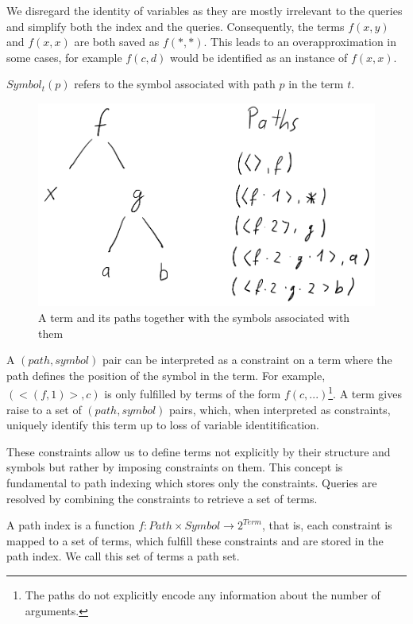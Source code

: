 We disregard the identity of variables as they are mostly irrelevant to the queries and simplify both the index and the queries. Consequently, the terms $f(x,y)$ and $f(x,x)$ are both saved as $f(*,*)$. This leads to an overapproximation in some cases, for example $f(c,d)$ would be identified as an instance of $f(x,x)$.

\begin{defn}
  $Symbol_{t}(p)$ refers to the symbol associated with path $p$ in the term $t$.
\end{defn}

\begin{figure}[h]
\centering
\includegraphics[scale=0.25]{figures/term_path.png}
\caption{A term and its paths together with the symbols associated with them}
\label{termpaths}
\end{figure}

A $(path, symbol)$ pair can be interpreted as a constraint on a term where the path defines the position of the symbol in the term. For example, $(<(f,1)>, c)$ is only fulfilled by terms of the form $f(c,...)$\footnote{The paths do not explicitly encode any information about the number of arguments.}. A term gives raise to a set of $(path, symbol)$ pairs, which, when interpreted as constraints, uniquely identify this term up to loss of variable identitification.

These constraints allow us to define terms not explicitly by their structure and symbols but rather by imposing constraints on them. This concept is fundamental to path indexing which stores only the constraints. Queries are resolved by combining the constraints to retrieve a set of terms.

\begin{defn}
  A path index is a function $f: Path \times Symbol \longrightarrow 2^{Term}$, that is, each constraint is mapped to a set of terms, which fulfill these constraints and are stored in the path index. We call this set of terms a path set.
\end{defn}

